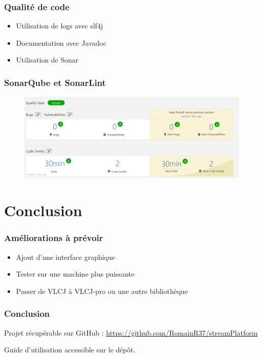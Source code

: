 \documentclass{beamer}
\begin{document}
\begin{frame}
\frametitle{Qualité de code}
	\begin{itemize}
		\item Utilisation de logs avec slf4j
		\item Documentation avec Javadoc
		\item Utilisation de Sonar 
	\end{itemize}
\end{frame}


\begin{frame}
\frametitle{SonarQube et SonarLint}

\begin{figure}
	\includegraphics[scale=0.40]{images/sonarresult}
\end{figure}

\end{frame}

\section*{Conclusion}

\begin{frame}
\frametitle{Améliorations à prévoir}

\begin{itemize}
	\item Ajout d'une interface graphique
	\item Tester sur une machine plus puissante
	\item Passer de VLCJ à VLCJ-pro ou une autre bibliothèque
\end{itemize}

\end{frame}

\begin{frame}
\frametitle{Conclusion}

Projet récupérable sur GitHub : \url{https://github.com/RomainR37/streamPlatform}
\bigbreak

Guide d'utilisation accessible sur le dépôt.

\end{frame}
\end{document}

